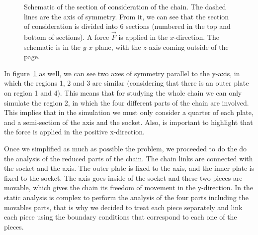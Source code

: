 \documentclass[a4paper 12pt]{article}
\begin{document}
\begin{figure}[!htbp]
\begin{center}
\end{center}
\caption{Schematic of the section of consideration of the chain. The dashed lines are the axis of symmetry. From it, we can see that the section of consideration is divided into 6 sections (numbered in the top and bottom of sections). A force $\vec{F}$ is applied in the $x$-direction. The schematic is in the $y$-$x$ plane, with the $z$-axis coming outside of the page.}
\label{chain_union}
\end{figure}

In figure~\ref{chain_union} as well, we can see two axes of symmetry parallel to the y-axis, in which the regions 1, 2 and 3 are similar (considering that there is an outer plate on region 1 and 4). This means that for studying the whole chain we can only simulate the region 2, in which the four different parts of the chain are involved. This implies that in the simulation we must only consider a quarter of each plate, and a semi-section of the axis and the socket. Also, is important to highlight that the force is applied in the positive x-direction.

Once we simplified as much as possible the problem, we proceeded to do the do the analysis of the reduced parts of the chain. The chain links are connected with the socket and the axis. The outer plate is fixed to the axis, and the inner plate is fixed to the socket. The axis goes inside of the socket and these two pieces are movable, which gives the chain its freedom of movement in the y-direction. In the static analysis is complex to perform the analysis of the four parts including the movables parts, that is why we decided to treat each piece separately and link each piece using the boundary conditions that correspond to each one of the pieces.
\end{document}
